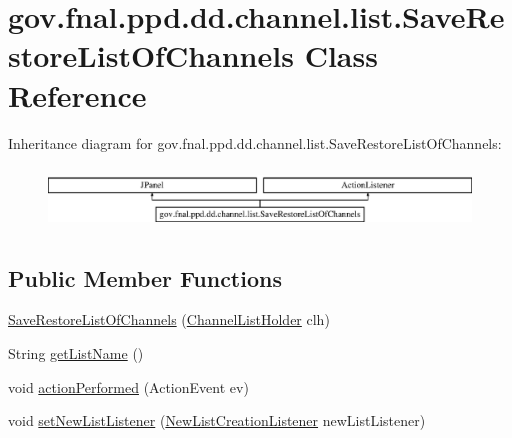 \hypertarget{classgov_1_1fnal_1_1ppd_1_1dd_1_1channel_1_1list_1_1SaveRestoreListOfChannels}{\section{gov.\-fnal.\-ppd.\-dd.\-channel.\-list.\-Save\-Restore\-List\-Of\-Channels Class Reference}
\label{classgov_1_1fnal_1_1ppd_1_1dd_1_1channel_1_1list_1_1SaveRestoreListOfChannels}
}
Inheritance diagram for gov.\-fnal.\-ppd.\-dd.\-channel.\-list.\-Save\-Restore\-List\-Of\-Channels\-:\begin{figure}[H]
\begin{center}
\leavevmode
\includegraphics[height=1.651917cm]{classgov_1_1fnal_1_1ppd_1_1dd_1_1channel_1_1list_1_1SaveRestoreListOfChannels}
\end{center}
\end{figure}
\subsection*{Public Member Functions}
\begin{DoxyCompactItemize}
\item 
\hyperlink{classgov_1_1fnal_1_1ppd_1_1dd_1_1channel_1_1list_1_1SaveRestoreListOfChannels_ab8848e015a8234858b67d9e254d84a41}{Save\-Restore\-List\-Of\-Channels} (\hyperlink{interfacegov_1_1fnal_1_1ppd_1_1dd_1_1channel_1_1ChannelListHolder}{Channel\-List\-Holder} clh)
\item 
String \hyperlink{classgov_1_1fnal_1_1ppd_1_1dd_1_1channel_1_1list_1_1SaveRestoreListOfChannels_a54059a2b37d7784581a793ad84faee50}{get\-List\-Name} ()
\item 
void \hyperlink{classgov_1_1fnal_1_1ppd_1_1dd_1_1channel_1_1list_1_1SaveRestoreListOfChannels_a3cf2f11c9d9a6a0241f2c676a182e2ee}{action\-Performed} (Action\-Event ev)
\item 
void \hyperlink{classgov_1_1fnal_1_1ppd_1_1dd_1_1channel_1_1list_1_1SaveRestoreListOfChannels_a8a041dd74a31fcf8084a680cd2458bbc}{set\-New\-List\-Listener} (\hyperlink{interfacegov_1_1fnal_1_1ppd_1_1dd_1_1channel_1_1list_1_1NewListCreationListener}{New\-List\-Creation\-Listener} new\-List\-Listener)
\end{DoxyCompactItemize}
